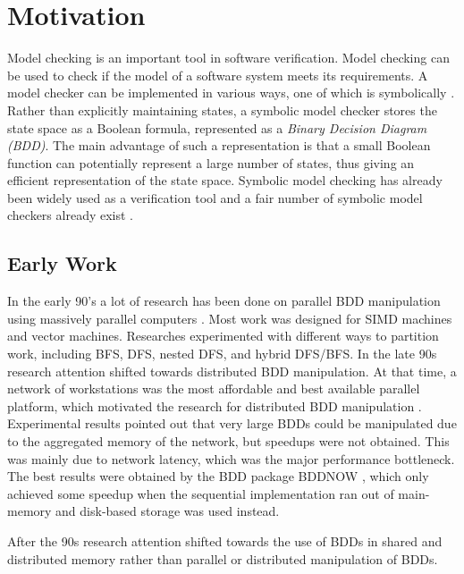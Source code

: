 \chapter{Motivation}

Model checking is an important tool in software verification. Model checking can be used to check if the model of a software system meets its requirements. A model checker can be implemented in various ways, one of which is symbolically \cite{mcmillan1993symbolic, clarke1996symbolic}. Rather than explicitly maintaining states, a symbolic model checker stores the state space as a Boolean formula, represented as a \emph{Binary Decision Diagram (BDD)}. The main advantage of such a representation is that a small Boolean function can potentially represent a large number of states, thus giving an efficient representation of the state space. Symbolic model checking has already been widely used as a verification tool and a fair number of symbolic model checkers already exist \cite{cimatti2000nusmv, marrying}. 

\section{Early Work}
In the early 90's a lot of research has been done on parallel BDD manipulation using massively parallel computers \cite{BDDNOW:parallel_bdd_package, 545652, Stornetta96implementationof, BDDNOW:parallel_bdd_package}. Most work was designed for SIMD machines and vector machines. Researches experimented with different ways to partition work, including BFS, DFS, nested DFS, and hybrid DFS/BFS. In the late 90s research attention shifted towards distributed BDD manipulation. At that time, a network of workstations was the most affordable and best available parallel platform, which motivated the research for distributed BDD manipulation \cite{BDDNOW:parallel_bdd_package}. Experimental results pointed out that very large BDDs could be manipulated due to the aggregated memory of the network, but speedups were not obtained. This was mainly due to network latency, which was the major performance bottleneck. The best results were obtained by the BDD package BDDNOW \cite{BDDNOW:parallel_bdd_package}, which only achieved some speedup when the sequential implementation ran out of main-memory and disk-based storage was used instead.

After the 90s research attention shifted towards the use of BDDs in shared and distributed memory rather than parallel or distributed manipulation of BDDs.

